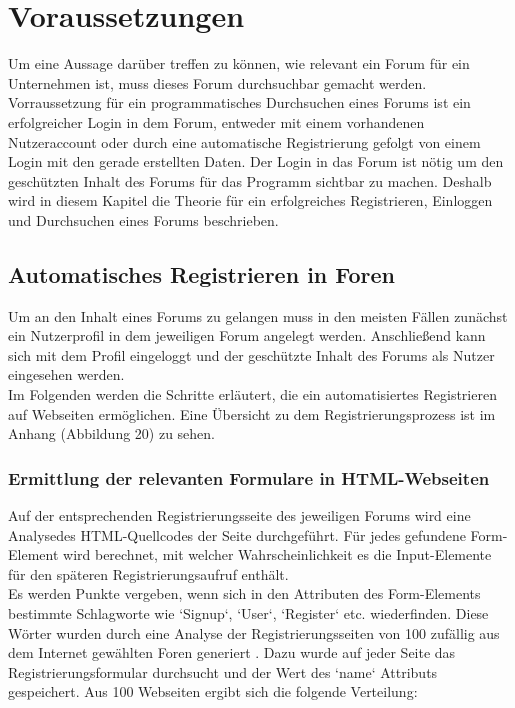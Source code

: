 \section{Voraussetzungen}
Um eine Aussage darüber treffen zu können, wie relevant ein Forum für ein Unternehmen ist, muss dieses Forum durchsuchbar gemacht werden.
Vorraussetzung für ein programmatisches Durchsuchen eines Forums ist ein erfolgreicher Login in dem Forum, entweder mit einem vorhandenen Nutzeraccount oder durch eine automatische Registrierung gefolgt von  einem Login mit den gerade erstellten Daten.
Der Login in das Forum ist nötig um den geschützten Inhalt des Forums für das Programm sichtbar zu machen. Deshalb wird in diesem Kapitel die Theorie für ein erfolgreiches Registrieren, Einloggen und Durchsuchen eines Forums beschrieben.

\subsection {Automatisches Registrieren in Foren}
Um an den Inhalt eines Forums zu gelangen muss in den meisten Fällen zunächst ein Nutzerprofil in dem jeweiligen Forum angelegt werden. Anschließend kann sich mit dem Profil eingeloggt und der geschützte Inhalt des Forums als Nutzer eingesehen werden. \\
Im Folgenden werden die Schritte erläutert, die ein automatisiertes Registrieren auf Webseiten ermöglichen.
Eine Übersicht zu dem Registrierungsprozess ist im Anhang (Abbildung 20) zu sehen.

\subsubsection{Ermittlung der relevanten Formulare in HTML-Webseiten}
Auf der entsprechenden Registrierungsseite des jeweiligen Forums wird eine Analysedes HTML-Quellcodes der Seite durchgeführt.
Für jedes gefundene Form-Element wird berechnet, mit welcher Wahrscheinlichkeit es die Input-Elemente für den späteren Registrierungsaufruf enthält. \\
Es werden Punkte vergeben, wenn sich in den Attributen des Form-Elements bestimmte Schlagworte wie `Signup`, `User`, `Register` etc. wiederfinden.
Diese Wörter wurden durch eine Analyse der Registrierungsseiten von 100 zufällig aus dem Internet gewählten Foren generiert . Dazu wurde auf jeder Seite das Registrierungsformular durchsucht und der Wert des `name` Attributs gespeichert. Aus 100 Webseiten ergibt sich die folgende Verteilung:

